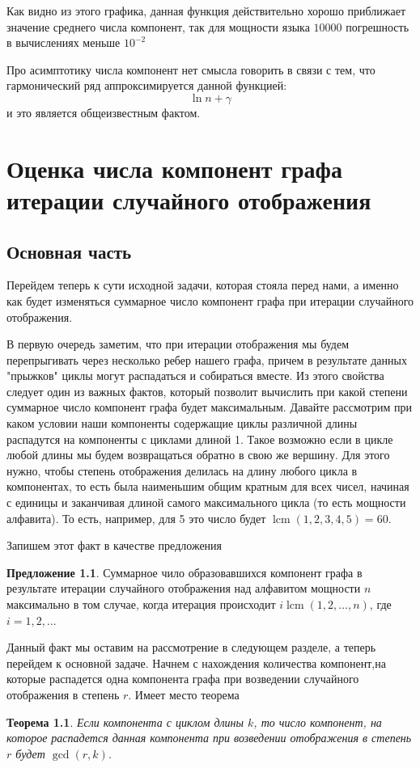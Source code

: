 \documentclass[10pt, a4paper]{report}
\newtheorem{theorem}{Теорема}[chapter]
\theoremstyle{definition}
\newtheorem{remark}{Предложение}[chapter]
\renewcommand{\log}{\ln}
\DeclareMathOperator{\lcm}{lcm}
\begin{document}
Как видно из этого графика, данная функция действительно хорошо приближает значение среднего числа компонент, так для мощности языка $10000$ погрешность в вычислениях меньше $10^{-2}$

Про асимптотику числа компонент нет смысла говорить в связи с тем, что гармонический ряд аппроксимируется  данной функцией:
$$
\log{n}+\gamma
$$ и это является общеизвестным фактом.

\chapter{Оценка числа компонент графа итерации случайного отображения}

\section{Основная часть}

Перейдем теперь к сути исходной задачи, которая стояла  перед нами, а именно как будет изменяться суммарное число компонент графа при итерации случайного отображения.

В первую очередь заметим, что при итерации отображения мы будем перепрыгивать через несколько ребер нашего графа, причем в результате данных "прыжков" циклы могут распадаться и собираться вместе. Из этого свойства следует один из важных фактов, который позволит вычислить при какой степени суммарное число компонент графа будет максимальным. Давайте рассмотрим при каком условии наши компоненты содержащие циклы различной длины распадутся на компоненты с циклами длиной 1. Такое возможно если в цикле любой длины мы будем возвращаться обратно в свою же вершину. Для этого нужно, чтобы степень отображения делилась на длину любого цикла в компонентах, то есть была наименьшим общим кратным для всех чисел, начиная с единицы и заканчивая длиной самого максимального цикла (то есть мощности алфавита). То есть, например, для 5 это число будет $\lcm(1,2,3,4,5) = 60$.
 
Запишем этот факт в качестве предложения
\begin{remark}
	Суммарное чило образовавшихся компонент графа в результате итерации случайного отображения над алфавитом мощности $n$ максимально в том случае, когда итерация происходит $i\lcm(1,2,...,n)$, где $i=1,2,...$ 
\end{remark}

Данный факт мы оставим на рассмотрение в следующем разделе, а теперь перейдем к основной задаче. Начнем с нахождения количества компонент,на которые распадется одна компонента графа при возведении случайного отображения в степень $r$. Имеет место теорема
\begin{theorem}
	 Если компонента с циклом длины $k$, то число компонент, на которое распадется данная компонента при возведении отображения в степень $r$ будет $\gcd(r,k)$.
\end{theorem}
\end{document}
